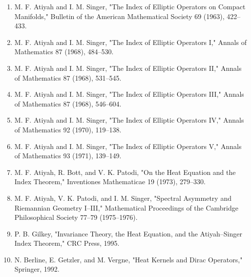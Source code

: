 \begin{enumerate}
\item M. F. Atiyah and I. M. Singer, "The Index of Elliptic Operators on Compact Manifolds," Bulletin of the American Mathematical Society 69 (1963), 422--433.
\item M. F. Atiyah and I. M. Singer, "The Index of Elliptic Operators I," Annals of Mathematics 87 (1968), 484--530.
\item M. F. Atiyah and I. M. Singer, "The Index of Elliptic Operators II," Annals of Mathematics 87 (1968), 531--545.
\item M. F. Atiyah and I. M. Singer, "The Index of Elliptic Operators III," Annals of Mathematics 87 (1968), 546--604.
\item M. F. Atiyah and I. M. Singer, "The Index of Elliptic Operators IV," Annals of Mathematics 92 (1970), 119--138.
\item M. F. Atiyah and I. M. Singer, "The Index of Elliptic Operators V," Annals of Mathematics 93 (1971), 139--149.
\item M. F. Atiyah, R. Bott, and V. K. Patodi, "On the Heat Equation and the Index Theorem," Inventiones Mathematicae 19 (1973), 279--330.
\item M. F. Atiyah, V. K. Patodi, and I. M. Singer, "Spectral Asymmetry and Riemannian Geometry I--III," Mathematical Proceedings of the Cambridge Philosophical Society 77--79 (1975--1976).
\item P. B. Gilkey, "Invariance Theory, the Heat Equation, and the Atiyah--Singer Index Theorem," CRC Press, 1995.
\item N. Berline, E. Getzler, and M. Vergne, "Heat Kernels and Dirac Operators," Springer, 1992.
\end{enumerate}
